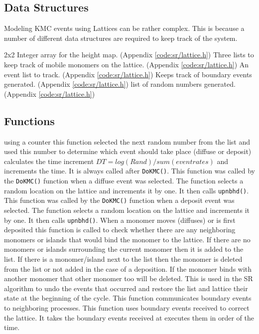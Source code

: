 \subsection{Data Structures}
Modeling KMC events using Lattices can be rather complex. This is because a number of different data structures are required to keep track of the system.

\small{\begin{description}
 2x2 Integer array for the height map. (Appendix \ref{code:sr/lattice.h})
 Three lists to keep track of mobile monomers on the lattice. (Appendix \ref{code:sr/lattice.h})
 An event list to track. (Appendix \ref{code:sr/lattice.h})
 Keeps track of boundary events generated. (Appendix \ref{code:sr/lattice.h})
 list of random numbers generated. (Appendix \ref{code:sr/lattice.h})
\end{description}}

\subsection{Functions}
\begin{description}
 using a counter this function selected the next random number from the list and used this number to determine which event should take place (diffuse or deposit)
 calculates the time increment $DT=log(Rand)/sum(event rates)$ and increments the time. It is always called after \texttt{DoKMC()}.
 This function was called by the \texttt{DoKMC()} function when a diffuse event was selected. The function selects a random location on the lattice and increments it by one. It then calls \texttt{upnbhd()}.
 This function was called by the \texttt{DoKMC()} function when a deposit event was selected. The function selects a random location on the lattice and increments it by one. It then calls \texttt{upnbhd()}.
 When a monomer moves (diffuses) or is first deposited this function is called to check whether there are any neighboring monomers or islands that would bind the monomer to the lattice. If there are no monomers or islands surrounding the current monomer then it is added to the list. If there is a monomer/island next to the list then the monomer is deleted from the list or not added in the case of a deposition. If the monomer binds with another monomer that other monomer too will be deleted.
 This is used in the SR algorithm to undo the events that occurred and restore the list and lattice their state at the beginning of the cycle.
 This function communicates boundary events to neighboring processes.
 This function uses boundary events received to correct the lattice. It takes the boundary events received at executes them in order of the time.
\end{description}

